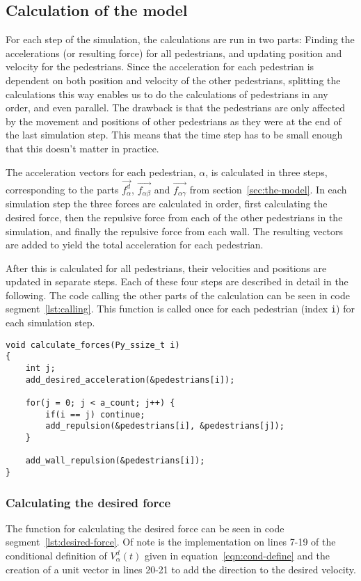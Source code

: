 \subsection{Calculation of the model}
\label{sec:model-calculation}
For each step of the simulation, the calculations are run in two parts: 
Finding the accelerations (or resulting force) for all pedestrians, and 
updating position and velocity for the pedestrians.  Since the acceleration 
for each pedestrian is dependent on both position and velocity of the other 
pedestrians, splitting the calculations this way enables us to do the 
calculations of pedestrians in any order, and even parallel. The drawback 
is that the pedestrians are only affected by the movement and positions of 
other pedestrians as they were at the end of the last simulation step. This 
means that the time step has to be small enough that this doesn't matter in 
practice.

The acceleration vectors for each pedestrian, $\alpha$, is calculated in three 
steps, corresponding to the parts $\overrightarrow{f_\alpha^d}$, 
$\overrightarrow{f_{\alpha \beta}}$ and $\overrightarrow{f_{\alpha \gamma}}$ from 
section~\ref{sec:the-model}. In each simulation step the three forces are 
calculated in order, first calculating the desired force, then the repulsive 
force from each of the other pedestrians in the simulation, and finally the 
repulsive force from each wall. The resulting vectors are added to yield the 
total acceleration for each pedestrian.

After this is calculated for all pedestrians, their velocities and positions are 
updated in separate steps. Each of these four steps are described in detail 
in the following. The code calling the other parts of the calculation can be 
seen in code segment~\ref{lst:calling}. This function is called once for each 
pedestrian (index \texttt{i}) for each simulation step.

\begin{lstlisting}[caption={Main function calling the other parts of the 
    calculation code.},label=lst:calling]
void calculate_forces(Py_ssize_t i)
{
    int j;
    add_desired_acceleration(&pedestrians[i]);

    for(j = 0; j < a_count; j++) {
        if(i == j) continue;
        add_repulsion(&pedestrians[i], &pedestrians[j]);
    }

    add_wall_repulsion(&pedestrians[i]);
}
\end{lstlisting}

\subsubsection{Calculating the desired force}
The function for calculating the desired force can be seen in code 
segment~\ref{lst:desired-force}. Of note is the implementation on lines 7-19 
of the conditional definition of $V_\alpha^d(t)$ given in 
equation~\eqref{eqn:cond-define} and the creation of a unit vector in lines 
20-21 to add the direction to the desired velocity.

